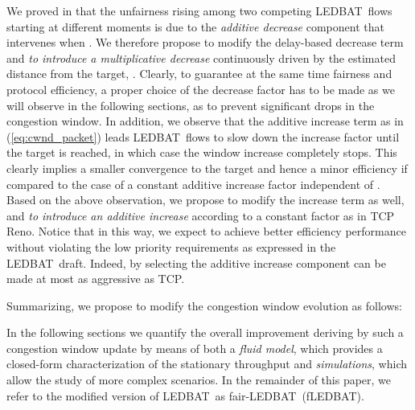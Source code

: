 \documentclass[conference]{IEEEtran}
\newcommand{\btledbat}[0]{LEDBAT}
\newcommand{\fledbat}[0]{fLEDBAT}
\begin{document}
We proved in \cite{globecom10} that the unfairness rising among two competing \btledbat\ flows starting at different moments is due to the
\emph{additive decrease} component   that intervenes when .
We therefore propose to modify the delay-based decrease term and \emph{to introduce a multiplicative decrease} continuously driven by the estimated distance from the target, .
Clearly, to guarantee at the same time fairness and protocol efficiency, a proper choice of the decrease factor has to be made as we will observe in the following sections, as to prevent significant drops in the congestion window.
In addition, we observe that the additive increase term as in (\ref{eq:cwnd_packet}) leads \btledbat\ flows to slow down the increase factor until the target  is reached, in which case the window increase completely stops.
This clearly implies a smaller convergence to the target and hence a minor efficiency if compared to the case of a constant additive increase factor  independent of . Based on the above observation, we propose to modify the increase term as well, and \emph{to introduce an additive increase} according to a constant factor  as in TCP Reno.
Notice that in this way, we expect to achieve better efficiency performance without violating the low priority requirements as expressed in the \btledbat\ draft. Indeed, by selecting  the additive increase component can be made at most as aggressive as TCP.




Summarizing, we propose to modify the congestion window evolution as follows:\\

\noindent 


In the following sections we quantify the overall improvement deriving by such a congestion window update by means of both a \emph{fluid model}, which provides a closed-form characterization of the stationary throughput and \emph{simulations}, which allow the study of more complex scenarios.
In the remainder of this paper, we refer to the modified version of \btledbat\ as fair-\btledbat\ (\fledbat).
\end{document}
